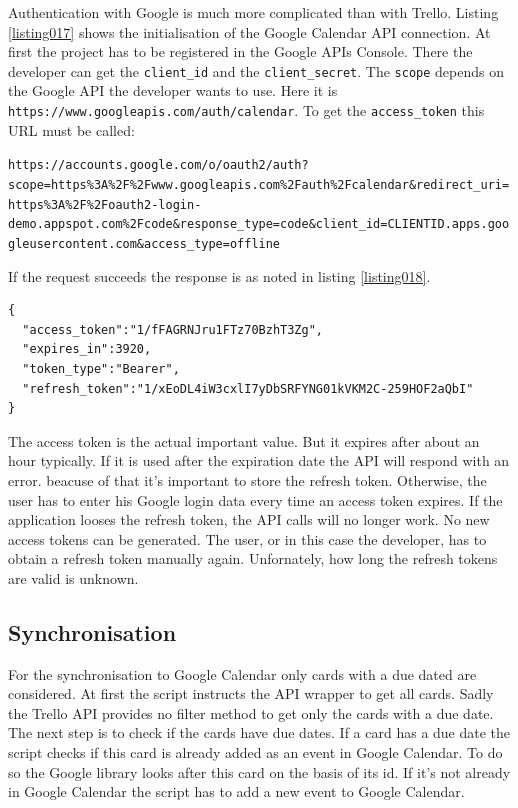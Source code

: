 Authentication with Google is much more complicated than with Trello. Listing \ref{listing017} shows the initialisation of the Google Calendar API connection. At first the project has to be registered in the Google APIs Console. \cite{google:apisconsole} There the developer can get the \lstinline{client_id} and the \lstinline{client_secret}. The \lstinline{scope} depends on the Google API the developer wants to use. Here it is \texttt{https://www.googleapis.com/auth/calendar}. \cite{google:apiscope} To get the \lstinline{access_token} this URL must be called: 
\begin{center}
\lstinline{https://accounts.google.com/o/oauth2/auth?scope=https%3A%2F%2Fwww.googleapis.com%2Fauth%2Fcalendar&redirect_uri=https%3A%2F%2Foauth2-login-demo.appspot.com%2Fcode&response_type=code&client_id=CLIENTID.apps.googleusercontent.com&access_type=offline}
\end{center}

If the request succeeds the response is as noted in listing \ref{listing018}.

\begin{lstlisting}[aboveskip=1\baselineskip, caption=Response of the token request., label=listing018]
{
  "access_token":"1/fFAGRNJru1FTz70BzhT3Zg",
  "expires_in":3920,
  "token_type":"Bearer",
  "refresh_token":"1/xEoDL4iW3cxlI7yDbSRFYNG01kVKM2C-259HOF2aQbI"
}
\end{lstlisting}

The access token is the actual important value. But it expires after about an hour typically. If it is used after the expiration date the API will respond with an error. beacuse of that it's important to store the refresh token. Otherwise, the user has to enter his Google login data every time an access token expires. If the application looses the refresh token, the API calls will no longer work. No new access tokens can be generated. The user, or in this case the developer, has to obtain a refresh token manually again. \cite{google:calapi} Unfornately, how long the refresh tokens are valid is unknown.

\subsection{Synchronisation}
For the synchronisation to Google Calendar only cards with a due dated are considered. At first the script instructs the API wrapper to get all cards. Sadly the Trello API provides no filter method to get only the cards with a due date. The next step is to check if the cards have due dates. If a card has a due date the script checks if this card is already added as an event in Google Calendar. To do so the Google library looks after this card on the basis of its id. If it's not already in Google Calendar the script has to add a new event to Google Calendar.

